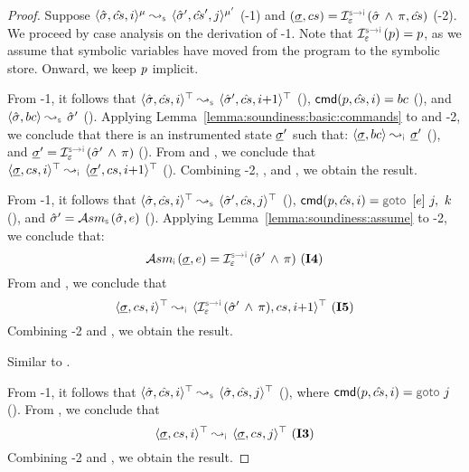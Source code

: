 \begin{proof}
{Suppose $\abssemrule{\sstate, \scs, i}{\sstate', \scs', j}{\mode}{\mode'}{\symbolic}$ (\hyp{1}) and 
$(\istate, \cs) = \interpret{\symbinst}{\senv}(\sstate \, \wedge \, \pc, \scs)$ (\hyp{2})}.
We proceed by case analysis on the derivation of \hyp{1}. Note that $\interpret{\symbinst}{\senv}(\prog) = \prog$, as we assume that symbolic variables have moved from the program to the symbolic store. Onward, we keep $p$ implicit.
\vspace{3pt}

\noindent {} 
From \hyp{1}, it follows that $\abssemrule{\sstate, \scs, i}{\sstate', \scs, i{+}1}{\top}{\top}{\symbolic}$ (), 
$\ccmd[\prog][\scs]{i} = \bcmd$ (), and $\absbsemrule{\sstate, \bcmd}{\sstate'}{\symbolic}$ (). 
Applying Lemma~\ref{lemma:soundiness:basic:commands} to  and \hyp{2}, we conclude that 
there is an instrumented state $\underline{\sigma}'$ such that: 
$\absbsemrule{\istate, \bcmd}{\istate'}{\instrumented}$ (), and $\istate' = \interpret{\symbinst}{\senv}(\sstate' \, \wedge \, \pc)$ (). 
From  and , we conclude that $\abssemrule{\istate, \cs, i}{\istate', \cs, i{+}1}{\top}{\top}{\instrumented}$ (). 
 Combining \hyp{2}, , and , we obtain the result.  
 \vspace{5pt}

\noindent {} 
From \hyp{1}, it follows that $\abssemrule{\sstate, \scs, i}{\sstate', \scs, j}{\top}{\top}{\symbolic}$ (), 
$\ccmd[\prog][\scs]{i} =  \ifgoto{\jsilexpr}{j}{k}$ (), and 
$ \sstate' = \absassume{\symbolic}(\sstate, \jsilexpr)$ (). 
Applying Lemma~\ref{lemma:soundiness:assume} to 
\hyp{2}, we conclude that:
$$ 
\absassume{\instrumented}(\istate, \jsilexpr) = \interpret{\symbinst}{\senv}(\sstate' \, \wedge \, \pc) \text{ (\ieq{4})}
$$  
From  and , we conclude that 
$$\abssemrule{\istate, \cs, i}{\interpret{\symbinst}{\senv}(\sstate' \, \wedge \, \pc), \cs, i{+}1}{\top}{\top}{\instrumented} \text{ (\ieq{5})}$$
Combining \hyp{2} and , we obtain the result.     
 \vspace{5pt}

\noindent {} Similar to . 
 \vspace{5pt}
 
\noindent {} From \hyp{1}, it follows that $\abssemrule{\sstate, \scs, i}{\sstate, \scs, j}{\top}{\top}{\symbolic}$ (),   
where $\ccmd[\prog][\scs]{i} = \goto \, j$ (). 
From , we conclude that 
$$\abssemrule{\istate, \cs, i}{\istate, \cs, j}{\top}{\top}{\instrumented} \text{ (\ieq{3})}$$
Combining \hyp{2} and , we obtain the result. 
 \vspace{3pt}
 

\end{proof}
